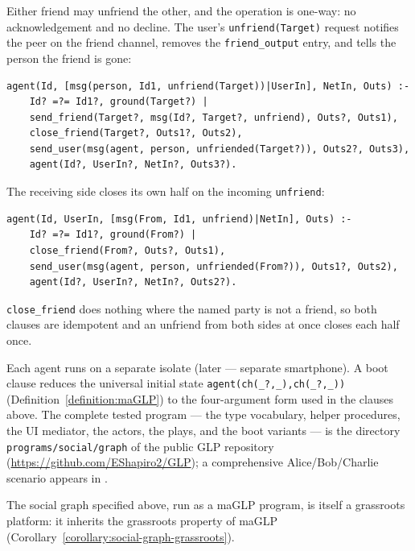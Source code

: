 Either friend may unfriend the other, and the operation is one-way: no acknowledgement and no decline. The user's \verb|unfriend(Target)| request notifies the peer on the friend channel, removes the \verb|friend_output| entry, and tells the person the friend is gone:
\begin{verbatim}
agent(Id, [msg(person, Id1, unfriend(Target))|UserIn], NetIn, Outs) :-
    Id? =?= Id1?, ground(Target?) |
    send_friend(Target?, msg(Id?, Target?, unfriend), Outs?, Outs1),
    close_friend(Target?, Outs1?, Outs2),
    send_user(msg(agent, person, unfriended(Target?)), Outs2?, Outs3),
    agent(Id?, UserIn?, NetIn?, Outs3?).
\end{verbatim}
The receiving side closes its own half on the incoming \verb|unfriend|:
\begin{verbatim}
agent(Id, UserIn, [msg(From, Id1, unfriend)|NetIn], Outs) :-
    Id? =?= Id1?, ground(From?) |
    close_friend(From?, Outs?, Outs1),
    send_user(msg(agent, person, unfriended(From?)), Outs1?, Outs2),
    agent(Id?, UserIn?, NetIn?, Outs2?).
\end{verbatim}
\verb|close_friend| does nothing where the named party is not a friend, so both clauses are idempotent and an unfriend from both sides at once closes each half once.

Each agent runs on a separate isolate (later --- separate smartphone). A boot clause reduces the universal initial state \verb|agent(ch(_?,_),ch(_?,_))| (Definition~\ref{definition:maGLP}) to the four-argument form used in the clauses above. The complete tested program --- the type vocabulary, helper procedures, the UI mediator, the actors, the plays, and the boot variants --- is the directory \verb|programs/social/graph| of the public GLP repository (\url{https://github.com/EShapiro2/GLP}); a comprehensive Alice/Bob/Charlie scenario appears in .

The social graph specified above, run as a maGLP program, is itself a grassroots platform: it inherits the grassroots property of maGLP (Corollary~\ref{corollary:social-graph-grassroots}).
